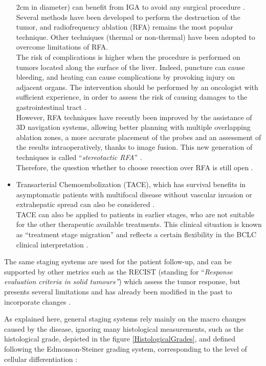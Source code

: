 \documentclass[]{article}
\begin{document}
\begin{itemize}
  2cm in diameter) can benefit from IGA to avoid any surgical
  procedure \cite{Forner2012}.\\
  Several methods have been developed to perform the destruction of the
  tumor, and radiofrequency ablation (RFA) remains the most
  popular technique. Other techniques (thermal or non-thermal) have been
  adopted to overcome limitations of RFA.\\
  The risk of complications is higher when the procedure is performed on
  tumors located along the surface of the liver. Indeed, puncture can
  cause bleeding, and heating can cause complications by provoking
  injury on adjacent organs. The intervention should be performed by an
  oncologist with sufficient experience, in order to assess the risk of
  causing damages to the gastrointestinal tract \cite{Breen2015}.\\
  However, RFA techniques have recently been improved by the
  assistance of 3D navigation systems, allowing better planning with
  multiple overlapping ablation zones, a more accurate placement of the
  probes and an assessment of the results intraoperatively, thanks to
  image fusion. This new generation of techniques is called
  ``\emph{stereotactic RFA}'' \cite{Perrodin2019,Bale2019,Laimer2020}.\\
  Therefore, the question whether to choose resection over RFA is
  still open \cite{Heimbach2018,Bale2019}.
\item Transarterial Chemoembolization (TACE), which has survival
  benefits in asymptomatic patients with multifocal disease without
  vascular invasion or extrahepatic spread can also be considered \cite{Forner2018}.\\
  TACE can also be applied to patients in earlier stages, who are
  not suitable for the other therapeutic available treatments. This
  clinical situation is known as ``treatment stage migration'' and
  reflects a certain flexibility in the BCLC clinical
  interpretation \cite{Burrel2012}.
\end{itemize}

The same staging systems are used for the patient follow-up, and can be
supported by other metrics such as the RECIST (standing for
``\emph{Response evaluation criteria in solid tumours''}) which assess
the tumor response, but presents several limitations and has already
been modified in the past to incorporate changes \cite{Eisenhauer2008}.

As explained here, general staging systems rely mainly on the macro
changes caused by the disease, ignoring many histological measurements,
such as the histological grade, depicted in the figure \ref{HistologicalGrades}, and defined following
the Edmonson-Steiner grading system, corresponding to the level of
cellular differentiation \cite{EdmondsonHA1954}:
\end{document}
